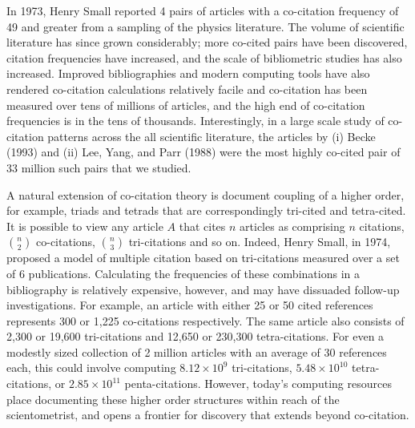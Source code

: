\documentclass[journal=jcdis8,manuscript=article]{achemso}
\begin{document}
In 1973, Henry Small reported 4 pairs of articles with a co-citation frequency of 49 and greater from a sampling of the physics literature. The volume of scientific literature has since grown considerably; more co-cited pairs have been discovered, citation frequencies have increased, and the scale of bibliometric studies has also increased. Improved bibliographies and modern computing tools have also rendered co-citation calculations relatively facile and co-citation has been measured over tens of millions of articles, and the high end of co-citation frequencies is in the tens of thousands. Interestingly, in a large scale study of co-citation patterns across the all scientific literature, the articles by (i) Becke (1993)\citep{becke1993dft} and (ii) Lee, Yang, and Parr (1988)\citep{lyp1988} were the most highly co-cited pair of 33 million such pairs that we studied. 

A natural extension of co-citation theory is document coupling of a higher order, for example, triads and tetrads that are correspondingly tri-cited and tetra-cited. It is possible to view any article $A$ that cites $n$ articles as comprising $n$ citations, $n\choose2$ co-citations, $n\choose3$ tri-citations and so on. Indeed, Henry Small, in 1974,  proposed a model of multiple citation based on tri-citations measured over a set of 6 publications.  Calculating the frequencies of these combinations in a bibliography is relatively expensive, however, and may have dissuaded follow-up investigations. For example, an article with either 25 or 50 cited references represents 300 or 1,225 co-citations respectively. The same article also consists of  2,300 or 19,600 tri-citations and  12,650 or  230,300 tetra-citations. For even a modestly sized collection of 2 million articles with an average of 30 references each, this could involve computing $8.12\times10^9$ tri-citations, $5.48\times10^{10}$ tetra-citations, or $2.85\times10^{11}$ penta-citations. However, today's computing resources place documenting these higher order structures within reach of the scientometrist, and opens a frontier for discovery that extends beyond co-citation.
\end{document}
